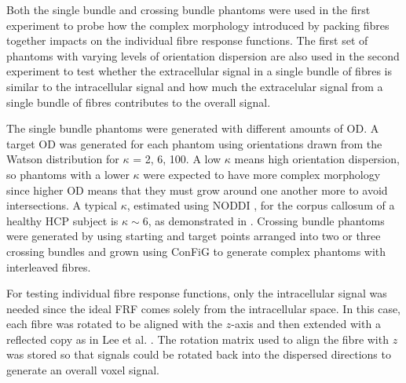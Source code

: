 Both the single bundle and crossing bundle phantoms were used in the first experiment to probe how the complex morphology introduced by packing fibres together impacts on the individual fibre response functions.
The first set of phantoms with varying levels of orientation dispersion are also used in the second experiment to test whether the extracellular signal in a single bundle of fibres is similar to the intracellular signal and how much the extracelular signal from a single bundle of fibres contributes to the overall signal.

The single bundle phantoms were generated with different amounts of \ac{OD}. A target \ac{OD} was generated for each phantom using orientations drawn from the Watson distribution \cite{Mardia2008} for $\kappa$ = 2, 6, 100.
A low $\kappa$ means high orientation dispersion, so phantoms with a lower $\kappa$ were expected to have more complex morphology since higher \ac{OD} means that they must grow around one another more to avoid intersections. A typical $\kappa$, estimated using \ac{NODDI} \cite{Zhang2012}, for the corpus callosum of a healthy \ac{HCP} \cite{Sotiropoulos2013a,VanEssen2012} subject is $\kappa \sim 6$, as demonstrated in .
Crossing bundle phantoms were generated by using starting and target points arranged into two or three crossing bundles and grown using \ac{ConFiG} to generate complex phantoms with interleaved fibres.

For testing individual fibre response functions, only the intracellular signal was needed since the ideal \ac{FRF} comes solely from the intracellular space. In this case, each fibre was rotated to be aligned with the $z$-axis and then extended with a reflected copy as in Lee et al. \cite{Lee2019a}. The rotation matrix used to align the fibre with $z$ was stored so that signals could be rotated back into the dispersed directions to generate an overall voxel signal.


